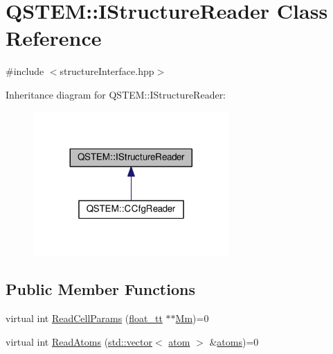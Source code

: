\hypertarget{class_q_s_t_e_m_1_1_i_structure_reader}{\section{Q\-S\-T\-E\-M\-:\-:I\-Structure\-Reader Class Reference}
\label{class_q_s_t_e_m_1_1_i_structure_reader}
}


{\ttfamily \#include $<$structure\-Interface.\-hpp$>$}



Inheritance diagram for Q\-S\-T\-E\-M\-:\-:I\-Structure\-Reader\-:
\nopagebreak
\begin{figure}[H]
\begin{center}
\leavevmode
\includegraphics[width=212pt]{class_q_s_t_e_m_1_1_i_structure_reader__inherit__graph}
\end{center}
\end{figure}
\subsection*{Public Member Functions}
\begin{DoxyCompactItemize}
\item 
virtual int \hyperlink{class_q_s_t_e_m_1_1_i_structure_reader_a61502527af837692803de6792b10bc55}{Read\-Cell\-Params} (\hyperlink{namespace_q_s_t_e_m_a915d7caa497280d9f927c4ce8d330e47}{float\-\_\-tt} $\ast$$\ast$\hyperlink{qmb_8m_af27b785a845d3df0f02f4259f63e97c0}{Mm})=0
\item 
virtual int \hyperlink{class_q_s_t_e_m_1_1_i_structure_reader_ae7384d16113b1982a2db4d99f68a705c}{Read\-Atoms} (\hyperlink{qmb_8m_af54b69a32590de218622e869b06b47b3}{std\-::vector}$<$ \hyperlink{namespace_q_s_t_e_m_a402dabc31a7a1fe906d0cdd138c69686}{atom} $>$ \&\hyperlink{qmb_8m_a7c5cd0264da47e230ba8c984690fe16c}{atoms})=0
\end{DoxyCompactItemize}


